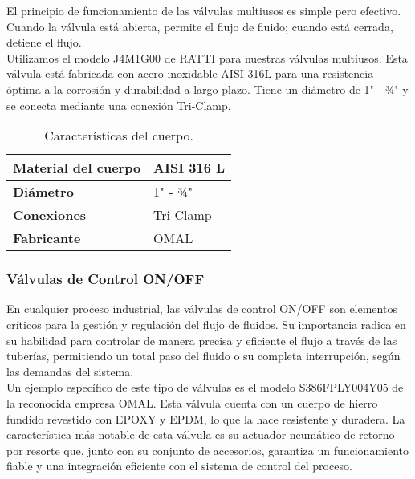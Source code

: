 El principio de funcionamiento de las válvulas multiusos es simple pero efectivo. Cuando la válvula está abierta, permite el flujo de fluido; cuando está cerrada, detiene el flujo.\\

Utilizamos el modelo J4M1G00 de RATTI para nuestras válvulas multiusos. Esta válvula está fabricada con acero inoxidable AISI 316L para una resistencia óptima a la corrosión y durabilidad a largo plazo. Tiene un diámetro de 1" - ¾" y se conecta mediante una conexión Tri-Clamp.\\

\begin{table}[H]
    \centering
    \caption{Características del cuerpo.}
    \label{table:valvula_multiusos}
    \begin{tabular}{| L{6cm} | L{6cm} |}
        \hline
        \textbf{Material del cuerpo} & AISI 316 L \\
        \hline
        \textbf{Diámetro} & 1" - ¾" \\
        \hline
        \textbf{Conexiones} & Tri-Clamp \\
        \hline
        \textbf{Fabricante} & OMAL \\
        \hline
    \end{tabular}
\end{table}

\subsubsection{Válvulas de Control ON/OFF}

En cualquier proceso industrial, las válvulas de control ON/OFF son elementos críticos para la gestión y regulación del flujo de fluidos. Su importancia radica en su habilidad para controlar de manera precisa y eficiente el flujo a través de las tuberías, permitiendo un total paso del fluido o su completa interrupción, según las demandas del sistema.\\

Un ejemplo específico de este tipo de válvulas es el modelo S386FPLY004Y05 de la reconocida empresa OMAL. Esta válvula cuenta con un cuerpo de hierro fundido revestido con EPOXY y EPDM, lo que la hace resistente y duradera. La característica más notable de esta válvula es su actuador neumático de retorno por resorte que, junto con su conjunto de accesorios, garantiza un funcionamiento fiable y una integración eficiente con el sistema de control del proceso.\\

